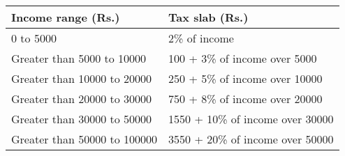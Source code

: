 \begin{tabular}{|l|l|}
\hline
\textbf{Income range (Rs.)} & \textbf{Tax slab (Rs.)} \\
\hline
0 to 5000 & 2\% of income \\
\hline
Greater than 5000 to 10000 & 100 + 3\% of income over 5000 \\
\hline
Greater than 10000 to 20000 & 250 + 5\% of income over 10000 \\
\hline
Greater than 20000 to 30000 & 750 + 8\% of income over 20000 \\
\hline
Greater than 30000 to 50000 & 1550 + 10\% of income over 30000 \\
\hline
Greater than 50000 to 100000 & 3550 + 20\% of income over 50000 \\
\hline
\end{tabular}
